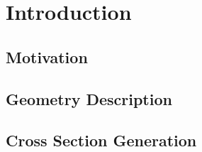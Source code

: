 \chapter{Introduction}
\label{ch:introduction}

\section{Motivation}
\section{Geometry Description}
\section{Cross Section Generation}
